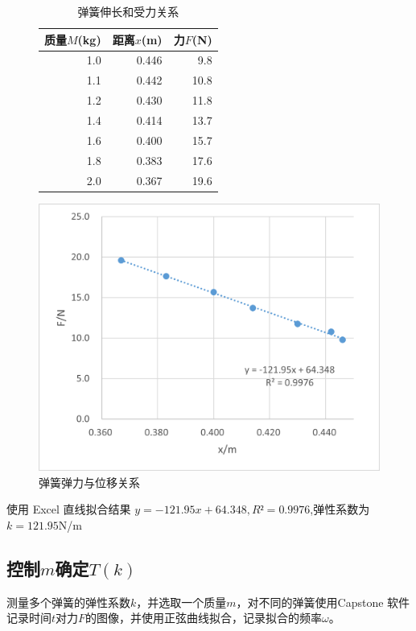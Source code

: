 \documentclass[a4paper,zihao=5,UTF8,fontset=fandol]{../phyreport}
\begin{document}
\begin{figure}[H]
	\centering
	\begin{minipage}{0.45\textwidth}
		\begin{table}[H]
			\centering
			\caption{弹簧伸长和受力关系}
			  \begin{tabular}{rrr}
			  \toprule
			  质量$M$(kg) &  距离$x$(m)& 力$F$(N)  \\
			  \midrule
			  1.0   & 0.446  & 9.8  \\
			  1.1   & 0.442  & 10.8  \\
			  1.2   & 0.430  & 11.8  \\
			  1.4   & 0.414  & 13.7  \\
			  1.6   & 0.400  & 15.7  \\
			  1.8   & 0.383  & 17.6  \\
			  2.0   & 0.367  & 19.6  \\
			  \bottomrule
			  \end{tabular}%
			\label{tab:实验一2计算k}%
		  \end{table}%
	\end{minipage}
	\begin{minipage}{0.45\textwidth}
		\centering
		\includegraphics[width=\linewidth]{./fig/实验1直线.png}
		\caption{弹簧弹力与位移关系}\label{fig:实验1直线}
	\end{minipage}
\end{figure}
使用 Excel 直线拟合结果 $y = -121.95x + 64.348,R² = 0.9976$,弹性系数为 $k=121.95$N/m

\subsection{控制$m$确定$T(k)$}
测量多个弹簧的弹性系数$k$，并选取一个质量$m$，对不同的弹簧使用Capstone 软件记录时间$t$对力$F$的图像，并使用正弦曲线拟合，记录拟合的频率$\omega$。
\end{document}
